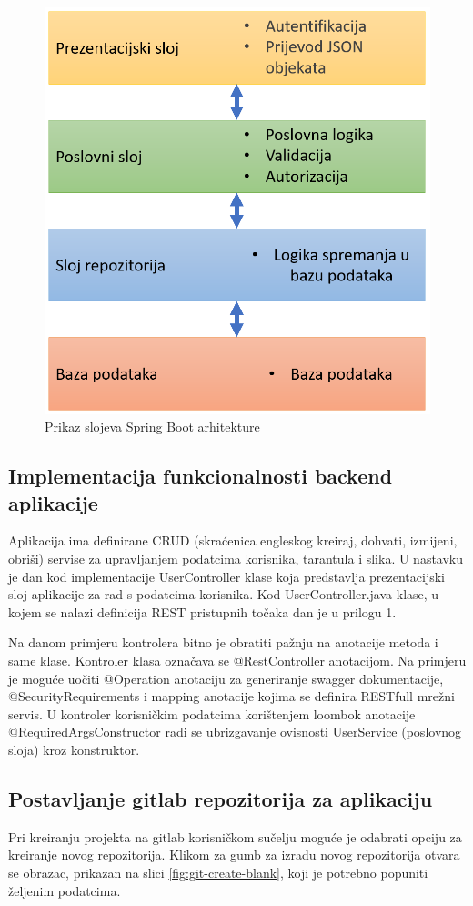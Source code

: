 \documentclass[a4paper,12pt,oneside]{article}
\begin{document}
\begin{figure}
    \centering
    \includegraphics[width=0.5\linewidth]{Slike/springMvcLogic.png}
    \caption{Prikaz slojeva Spring Boot arhitekture \cite{springArchitectureLayers}}
    \label{fig:dijagram-arch-apk}
\end{figure}




\subsection{Implementacija funkcionalnosti backend aplikacije}

Aplikacija ima definirane CRUD (skraćenica engleskog kreiraj, dohvati, izmijeni, obriši) servise za upravljanjem podatcima korisnika, tarantula i slika. U nastavku je dan kod implementacije UserController klase koja predstavlja prezentacijski sloj aplikacije za rad s podatcima korisnika. Kod UserController.java klase, u kojem se nalazi definicija REST pristupnih točaka dan je u prilogu 1.




Na danom primjeru kontrolera bitno je obratiti pažnju na anotacije metoda i same klase. Kontroler klasa označava se @RestController anotacijom. Na primjeru je moguće uočiti @Operation anotaciju za generiranje swagger dokumentacije, @SecurityRequirements i mapping anotacije kojima se definira RESTfull mrežni servis. U kontroler korisničkim podatcima korištenjem loombok anotacije @RequiredArgsConstructor radi se ubrizgavanje ovisnosti UserService (poslovnog sloja) kroz konstruktor.

\subsection{Postavljanje gitlab repozitorija za aplikaciju}

Pri kreiranju projekta na gitlab korisničkom sučelju moguće je odabrati opciju za kreiranje novog repozitorija. Klikom za gumb za izradu novog repozitorija otvara se obrazac, prikazan na slici \ref{fig:git-create-blank}, koji je potrebno popuniti željenim podatcima.
\end{document}
